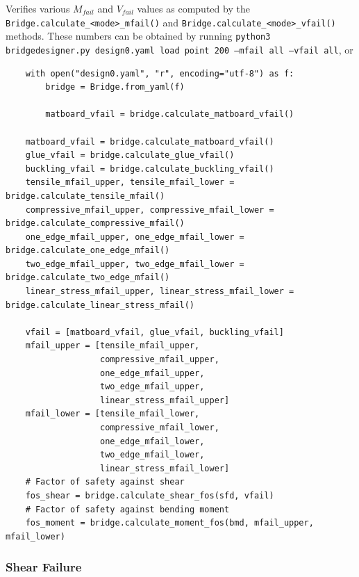 \documentclass{article}
\begin{document}
Verifies various \(M_{fail}\) and \(V_{fail}\) values as computed by the \texttt{Bridge.calculate_<mode>_mfail()}
and \texttt{Bridge.calculate_<mode>_vfail()} methods. These numbers can be obtained by running
\texttt{python3 bridgedesigner.py design0.yaml load point 200 --mfail all --vfail all}, or
\begin{verbatim}
    with open("design0.yaml", "r", encoding="utf-8") as f:
        bridge = Bridge.from_yaml(f)
    
        matboard_vfail = bridge.calculate_matboard_vfail()
    
    matboard_vfail = bridge.calculate_matboard_vfail()
    glue_vfail = bridge.calculate_glue_vfail()
    buckling_vfail = bridge.calculate_buckling_vfail()
    tensile_mfail_upper, tensile_mfail_lower = bridge.calculate_tensile_mfail()
    compressive_mfail_upper, compressive_mfail_lower = bridge.calculate_compressive_mfail()
    one_edge_mfail_upper, one_edge_mfail_lower = bridge.calculate_one_edge_mfail()
    two_edge_mfail_upper, two_edge_mfail_lower = bridge.calculate_two_edge_mfail()
    linear_stress_mfail_upper, linear_stress_mfail_lower = bridge.calculate_linear_stress_mfail()

    vfail = [matboard_vfail, glue_vfail, buckling_vfail]
    mfail_upper = [tensile_mfail_upper,
                   compressive_mfail_upper,
                   one_edge_mfail_upper,
                   two_edge_mfail_upper,
                   linear_stress_mfail_upper]
    mfail_lower = [tensile_mfail_lower,
                   compressive_mfail_lower,
                   one_edge_mfail_lower,
                   two_edge_mfail_lower,
                   linear_stress_mfail_lower]
    # Factor of safety against shear
    fos_shear = bridge.calculate_shear_fos(sfd, vfail)
    # Factor of safety against bending moment
    fos_moment = bridge.calculate_moment_fos(bmd, mfail_upper, mfail_lower)
\end{verbatim}

\subsubsection{Shear Failure}
\end{document}

